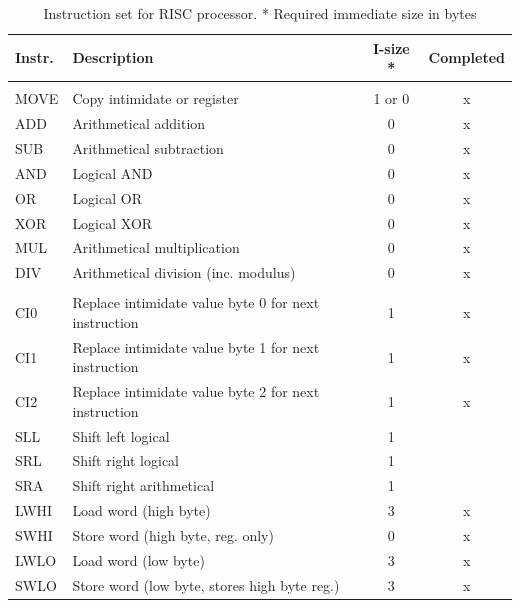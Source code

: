 \documentclass[a4paper,12pt]{article}
\begin{document}
\begin{longtable}[h!]{| l | p{} | c | c |}
	\caption{Instruction set for RISC processor. * Required immediate size in bytes}
	\label{table:risc_instr}\\
	
	\hline 
	\rowcolor[rgb]{0.82,0.82,0.82}
	Instr. & Description & I-size * & Completed \\\hline
	\endhead		
	
	\arrayrulecolor{black}\hline
	\endfoot

	\multicolumn{4}{|c|}{
		\cellcolor[rgb]{0.7,0.7,1}\textit{2 register instructions}} \\\hline
	\arrayrulecolor[rgb]{0.82,0.82,0.82}
	
	MOVE & Copy intimidate or register & 1 or 0 & x \\\hline
	ADD  & Arithmetical addition & 0 & x \\
	SUB  & Arithmetical subtraction & 0  & x \\
	AND  & Logical AND & 0 & x \\
	OR   & Logical OR & 0 & x \\
	XOR  & Logical XOR & 0 & x \\
	MUL  & Arithmetical multiplication & 0 & x \\
	DIV  & Arithmetical division (inc. modulus) & 0 & x \\
		

	\arrayrulecolor{black}\hline
	\multicolumn{4}{|c|}{
		\cellcolor[rgb]{0.7,0.7,1}\textit{1 register instructions}} \\
	\hline\arrayrulecolor[rgb]{0.82,0.82,0.82}
	
	CI0  & Replace intimidate value byte 0 for next instruction & 1 & x \\
	CI1  & Replace intimidate value byte 1 for next instruction & 1 & x \\
	CI2  & Replace intimidate value byte 2 for next instruction & 1 & x \\\hline
		
	SLL  & Shift left logical & 1 & \\
	SRL  & Shift right logical & 1 & \\
	SRA  & Shift right arithmetical & 1 & \\\hline
		
	LWHI & Load word (high byte) & 3 & x \\
	SWHI & Store word (high byte, reg. only) & 0 & x \\
	LWLO & Load word (low byte) & 3 & x \\
	SWLO & Store word (low byte, stores high byte reg.) & 3 & x \\\hline
		

\end{longtable}
\end{document}
